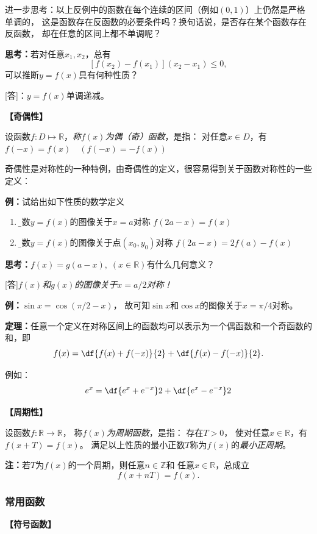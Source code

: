 进一步思考：以上反例中的函数在每个连续的区间（例如$(0,1)$）上仍然是严格单调的，
这是函数存在反函数的必要条件吗？换句话说，是否存在某个函数存在反函数，
却在任意的区间上都不单调呢？

{\b {\bf 思考：}若对任意$x_1,x_2$，总有
$$[f(x_2)-f(x_1)](x_2-x_1)\leq 0,$$
可以推断$y=f(x)$具有何种性质？}

[答]：$y=f(x)$单调递减。

{\bf 【奇偶性】}

	设函数$f:D\mapsto\mathbb{R}$，{\it 称$f(x)$为偶（奇）函数}，是指：
	对任意$x\in D$，有$f(-x)=f(x)\quad(f(-x)=-f(x))$

奇偶性是对称性的一种特例，由奇偶性的定义，很容易得到关于函数对称性的一些定义：

{\bf 例：}试给出如下性质的数学定义
\begin{enumerate}[(1)]
  \setlength{\itemindent}{1cm}
  \item {\b 函数$y=f(x)$的图像关于$x=a$对称
  \dotfill$f(2a-x)=f(x)$}
  \item {\b 函数$y=f(x)$的图像关于点$(x_0,y_0)$对称
  \dotfill $f(2a-x)=2f(a)-f(x)$}
\end{enumerate}

{\b {\bf 思考：}$f(x)=g(a-x),\;(x\in\mathbb{R})$有什么几何意义？

[答]{\it $f(x)$和$g(x)$的图像关于$x=a/2$对称！}}

{\bf 例：}$\sin x=\cos(\pi/2-x)$，
故可知$\sin x$和$\cos x$的图像关于$x=\pi/4$对称。

\begin{thx}
	{\bf 定理：}任意一个定义在对称区间上的函数均可以表示为一个偶函数和一个奇函数的和，即
	$$f(x)=\df{f(x)+f(-x)}{2}+\df{f(x)-f(-x)}{2}.$$
\end{thx}
例如：
$$e^x=\df{e^x+e^{-x}}2+\df{e^x-e^{-x}}2$$

{\bf 【周期性】}

设函数$f:\mathbb{R}\to\mathbb{R}$，
称{\it $f(x)$为周期函数}，是指： 存在$T>0$，
使对任意$x\in\mathbb{R}$，有
$f(x+T)=f(x)$。
满足以上性质的最小正数$T$称为$f(x)$的{\it 最小正周期}。
		 
{\bf 注：}若$T$为$f(x)$的一个周期，则任意$n\in\mathbb{Z}$和
任意$x\in\mathbb{R}$，总成立
$$f(x+nT)=f(x).$$

\subsubsection{常用函数}

{\bf 【符号函数】}

